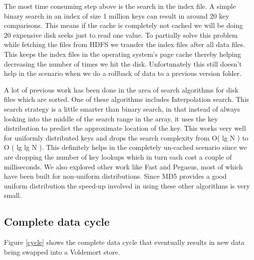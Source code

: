 \documentclass[10pt,twocolumn,preprint,natbib,authoryear]{sigplanconf}
\begin{document}
The most time consuming step above is the search in the index file. A simple binary search in an index of size 1 million keys can result in around 20 key comparisons. This means if the cache is completely not cached we will be doing 20 expensive disk seeks just to read one value. To partially solve this problem while fetching the files from HDFS we transfer the index files after all data files. This keeps the index files in the operating system's page cache thereby helping decreasing the number of times we hit the disk. Unfortunately this still doesn't help in the scenario when we do a rollback of data to a previous version folder. 

A lot of previous work has been done in the area of search algorithms for disk files which are sorted. One of these algorithms includes Interpolation search\cite{An adaptation of a root finding method to searching ordered disk files}. This search strategy is a little smarter than binary search, in that instead of always looking into the middle of the search range in the array, it uses the key distribution to predict the approximate location of the key. This works very well for uniformly distributed keys and drops the search complexity from O( lg N ) to O ( lg lg N ). This definitely helps in the completely un-cached scenario since we are dropping the number of key lookups which in turn each cost a couple of milliseconds. We also explored other work like Fast and Pegasus, most of which have been built for non-uniform distributions. Since MD5 provides a good uniform distribution the speed-up involved in using these other algorithms is very small. 


\subsection{Complete data cycle}
\label{sec:read_only:data_cycle}

Figure \ref{cycle} shows the complete data cycle that eventually results in new data being swapped into a Voldemort store. 
\end{document}
